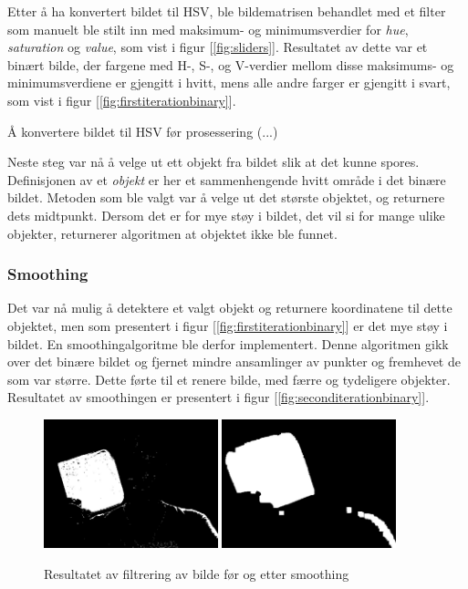 Etter å ha konvertert bildet til HSV, ble bildematrisen behandlet med et filter som manuelt ble stilt inn med maksimum- og minimumsverdier for \emph{hue}, \emph{saturation} og \emph{value}, som vist i figur [\ref{fig:sliders}]. Resultatet av dette var et binært bilde, der fargene med H-, S-, og V-verdier mellom disse maksimums- og minimumsverdiene er gjengitt i hvitt, mens alle andre farger er gjengitt i svart, som vist i figur [\ref{fig:firstiterationbinary}].

Å konvertere bildet til HSV før prosessering (...)

Neste steg var nå å velge ut ett objekt fra bildet slik at det kunne spores. Definisjonen av et \emph{objekt} er her et sammenhengende hvitt område i det binære bildet. Metoden som ble valgt var å velge ut det største objektet, og returnere dets midtpunkt. Dersom det er for mye støy i bildet, det vil si for mange ulike objekter, returnerer algoritmen at objektet ikke ble funnet.

\subsubsection{Smoothing}
Det var nå mulig å detektere et valgt objekt og returnere koordinatene til dette objektet, men som presentert i figur [\ref{fig:firstiterationbinary}] er det mye støy i bildet. En smoothingalgoritme ble derfor implementert. Denne algoritmen gikk over det binære bildet og fjernet mindre ansamlinger av punkter og fremhevet de som var større. Dette førte til et renere bilde, med færre og tydeligere objekter. Resultatet av smoothingen er presentert i figur [\ref{fig:seconditerationbinary}].

\begin{figure}[!ht]
	\centering
	{\includegraphics[width=0.45\textwidth]{img/first-binary.jpg}}
	{\includegraphics[width=0.45\textwidth]{img/second-binary.jpg}}
	\caption{Resultatet av filtrering av bilde før og etter smoothing}
\end{figure}

